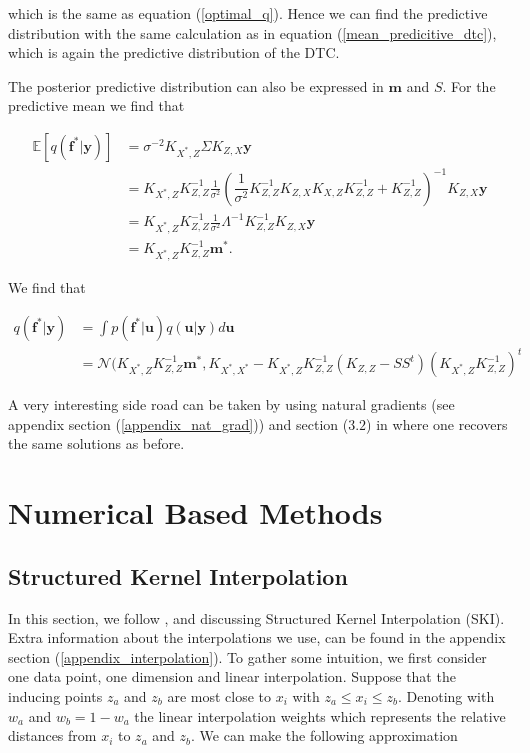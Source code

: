 \documentclass[12pt,a4paper,oneside]{book}
\begin{document}
which is the same as equation (\ref{optimal_q}). Hence we can find the predictive distribution with the same calculation as in equation (\ref{mean_predicitive_dtc}), which is again the predictive distribution of the DTC. 


The posterior predictive distribution can also be expressed in $\bm{m}$ and $S$. For the predictive mean we find that

\begin{align}
\mathbb{E} [q(\bm{f}^{\ast}|\bm{y})] &= \sigma^{-2} K_{X^{\ast},Z} \Sigma K_{Z,X} \bm{y} \nonumber \\ 
&= K_{X^{\ast},Z} K^{-1}_{Z,Z} \frac{1}{\sigma^2} (\dfrac{1}{\sigma^2} K_{Z,Z}^{-1} K_{Z,X} K_{X,Z}   K_{Z,Z}^{-1} + K_{Z,Z}^{-1} )^{-1} K_{Z,X} \bm{y} \nonumber \\ 
&= K_{X^{\ast},Z} K^{-1}_{Z,Z} \frac{1}{\sigma^2} \Lambda^{-1} K_{Z,Z}^{-1} K_{Z,X} \bm{y} \nonumber \\
&= K_{X^{\ast},Z} K^{-1}_{Z,Z} \bm{m}^{\ast}.
\end{align}

We find that

\begin{align}\label{variational_pred}
q(\bm{f}^{\ast}|\bm{y}) &= \int p(\bm{f}^{\ast} | \bm{u}) q(\bm{u}| \bm{y}) d\bm{u}  \nonumber \\ &= \mathcal{N} (K_{X^{\ast},Z} K^{-1}_{Z,Z} \bm{m}^{\ast} , K_{X^{\ast},X^{\ast}} - K_{X^{\ast},Z} K^{-1}_{Z,Z} (K_{Z,Z}- S S^t ) (K_{X^{\ast},Z} K^{-1}_{Z,Z})^t
\end{align}


A very interesting side road can be taken by using natural gradients (see appendix section (\ref{appendix_nat_grad})) and section ($3.2$) in \cite{hensman2013gaussian} where one recovers the same solutions as before. 


\chapter{Numerical Based Methods}

\section{Structured Kernel Interpolation}\label{section_struct_ker_interpol}

In this section, we follow \cite{wilson2015kernel}, \cite{wilson2015thoughts} and \cite{dong2017scalable} discussing Structured Kernel Interpolation (SKI). Extra information about the interpolations we use, can be found in the appendix section (\ref{appendix_interpolation}). To gather some intuition, we first consider one data point, one dimension and linear interpolation. Suppose that the inducing points $z_{a}$ and $z_{b}$ are most close to $x_i$ with $z_{a} \leq x_i \leq z_{b}$. Denoting with $w_{a}$ and $w_b = 1-w_a$ the linear interpolation weights which represents the relative distances from $x_i$ to $z_{a}$ and $z_{b}$. We can make the following approximation 
\end{document}

